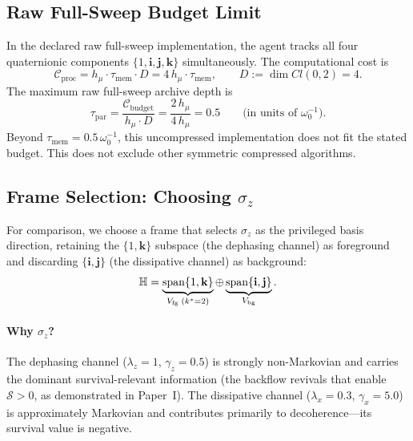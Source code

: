 \documentclass[12pt,a4paper,openany]{book}
\begin{document}
\subsection{Raw Full-Sweep Budget Limit}
\label{II-subsec:unbroken}

In the declared raw full-sweep implementation, the agent tracks all four
quaternionic components
$\{1, \mathbf{i}, \mathbf{j}, \mathbf{k}\}$
simultaneously.
The computational cost is
\begin{equation}
\label{II-eq:cost_full}
\mathcal{C}_{\mathrm{proc}}
= h_\mu \cdot \tau_{\mathrm{mem}} \cdot D
= 4\,h_\mu \cdot \tau_{\mathrm{mem}},
\qquad D := \dim Cl(0,2) = 4.
\end{equation}
The maximum raw full-sweep archive depth is
\begin{equation}
\label{II-eq:t_par_example}
\tau_{\mathrm{par}}
= \frac{\mathcal{C}_{\mathrm{budget}}}
       {h_\mu \cdot D}
= \frac{2\,h_\mu}{4\,h_\mu} = 0.5
\qquad\text{(in units of $\omega_0^{-1}$)}.
\end{equation}
Beyond $\tau_{\mathrm{mem}} = 0.5\,\omega_0^{-1}$,
this uncompressed implementation does not fit the stated budget.  This
does not exclude other symmetric compressed algorithms.

\subsection{Frame Selection: Choosing $\sigma_z$}
\label{II-subsec:choosing}

For comparison, we choose a frame that selects $\sigma_z$
as the privileged basis direction,
retaining the $\{1, \mathbf{k}\}$ subspace (the dephasing
channel) as foreground and discarding
$\{\mathbf{i}, \mathbf{j}\}$ (the dissipative channel)
as background:
\begin{equation}
\label{II-eq:decomp_example}
\mathbb{H}
= \underbrace{\mathrm{span}\{1, \mathbf{k}\}}_{%
  V_{\mathrm{fg}}\; (k^* = 2)}
\oplus
\underbrace{\mathrm{span}\{\mathbf{i}, \mathbf{j}\}}_{%
  V_{\mathrm{bg}}}.
\end{equation}

\paragraph{Why $\sigma_z$?}
The dephasing channel ($\lambda_z = 1$, $\gamma_z = 0.5$)
is strongly non-Markovian and carries the dominant
survival-relevant information (the backflow revivals that
enable $\mathcal{S} > 0$, as demonstrated in Paper~I).
The dissipative channel ($\lambda_x = 0.3$, $\gamma_x = 5.0$)
is approximately Markovian and contributes primarily to
decoherence---its survival value is negative.
\end{document}
